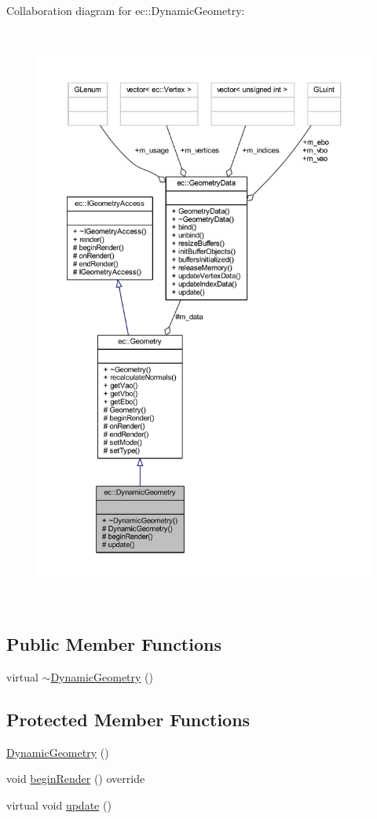 Collaboration diagram for ec\+:\+:Dynamic\+Geometry\+:\nopagebreak
\begin{figure}[H]
\begin{center}
\leavevmode
\includegraphics[height=550pt]{classec_1_1_dynamic_geometry__coll__graph}
\end{center}
\end{figure}
\subsection*{Public Member Functions}
\begin{DoxyCompactItemize}
\item 
virtual \mbox{\hyperlink{classec_1_1_dynamic_geometry_aeed5b7ffd9876f086207dbaf7e5bc6fc}{$\sim$\+Dynamic\+Geometry}} ()
\end{DoxyCompactItemize}
\subsection*{Protected Member Functions}
\begin{DoxyCompactItemize}
\item 
\mbox{\hyperlink{classec_1_1_dynamic_geometry_a4b0b6439b7c04f652eb74305abfe3bb9}{Dynamic\+Geometry}} ()
\item 
void \mbox{\hyperlink{classec_1_1_dynamic_geometry_ae4eb49e852a4c300325a288bf9ea4408}{begin\+Render}} () override
\item 
virtual void \mbox{\hyperlink{classec_1_1_dynamic_geometry_a76ddfd59d22b89ada5af4fc57e118dee}{update}} ()
\end{DoxyCompactItemize}
